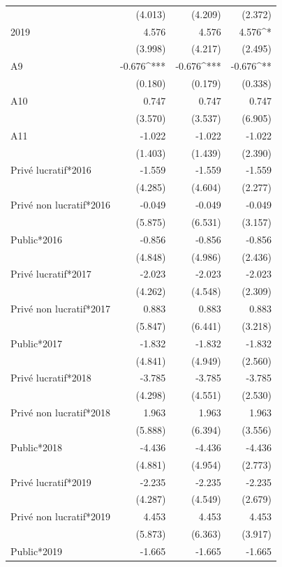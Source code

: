 \begin{table}[!htbp]
{\begin{tabular}{@{\extracolsep{5pt}}lD{.}{.}{-3} D{.}{.}{-3} D{.}{.}{-3} }
  & (4.013) & (4.209) & (2.372) \\ 
  2019 & 4.576 & 4.576 & 4.576^{*} \\ 
  & (3.998) & (4.217) & (2.495) \\ 
  A9 & -0.676^{***} & -0.676^{***} & -0.676^{**} \\ 
  & (0.180) & (0.179) & (0.338) \\ 
  A10 & 0.747 & 0.747 & 0.747 \\ 
  & (3.570) & (3.537) & (6.905) \\ 
  A11 & -1.022 & -1.022 & -1.022 \\ 
  & (1.403) & (1.439) & (2.390) \\ 
  Privé lucratif*2016 & -1.559 & -1.559 & -1.559 \\ 
  & (4.285) & (4.604) & (2.277) \\ 
  Privé non lucratif*2016 & -0.049 & -0.049 & -0.049 \\ 
  & (5.875) & (6.531) & (3.157) \\ 
  Public*2016 & -0.856 & -0.856 & -0.856 \\ 
  & (4.848) & (4.986) & (2.436) \\ 
  Privé lucratif*2017 & -2.023 & -2.023 & -2.023 \\ 
  & (4.262) & (4.548) & (2.309) \\ 
  Privé non lucratif*2017 & 0.883 & 0.883 & 0.883 \\ 
  & (5.847) & (6.441) & (3.218) \\ 
  Public*2017 & -1.832 & -1.832 & -1.832 \\ 
  & (4.841) & (4.949) & (2.560) \\ 
  Privé lucratif*2018 & -3.785 & -3.785 & -3.785 \\ 
  & (4.298) & (4.551) & (2.530) \\ 
  Privé non lucratif*2018 & 1.963 & 1.963 & 1.963 \\ 
  & (5.888) & (6.394) & (3.556) \\ 
  Public*2018 & -4.436 & -4.436 & -4.436 \\ 
  & (4.881) & (4.954) & (2.773) \\ 
  Privé lucratif*2019 & -2.235 & -2.235 & -2.235 \\ 
  & (4.287) & (4.549) & (2.679) \\ 
  Privé non lucratif*2019 & 4.453 & 4.453 & 4.453 \\ 
  & (5.873) & (6.363) & (3.917) \\ 
  Public*2019 & -1.665 & -1.665 & -1.665 \\ 

\end{tabular}}
\end{table}

